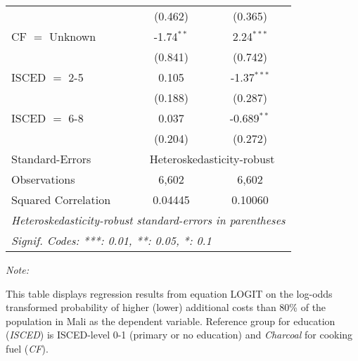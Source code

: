 \begin{table}[htbp!]
\begin{adjustbox}{width = 1\textwidth, max height = 0.95\textheight, center}
\begin{threeparttable}[b]
\begin{tabular}{lcc}
                                 & (0.462)        & (0.365)\\   
            CF $=$ Unknown       & -1.74$^{**}$   & 2.24$^{***}$\\   
                                 & (0.841)        & (0.742)\\   
            ISCED $=$ 2-5        & 0.105          & -1.37$^{***}$\\   
                                 & (0.188)        & (0.287)\\   
            ISCED $=$ 6-8        & 0.037          & -0.689$^{**}$\\   
                                 & (0.204)        & (0.272)\\   
            \midrule 
            Standard-Errors & \multicolumn{2}{c}{Heteroskedasticity-robust} \\ 
            Observations         & 6,602          & 6,602\\  
            Squared Correlation  & 0.04445        & 0.10060\\  
            \midrule \midrule
            \multicolumn{3}{l}{\emph{Heteroskedasticity-robust standard-errors in parentheses}}\\
            \multicolumn{3}{l}{\emph{Signif. Codes: ***: 0.01, **: 0.05, *: 0.1}}\\
         \end{tabular}
         
         \begin{tablenotes}\item \medskip \textit{Note:}
            \item This table displays regression results from equation LOGIT on the log-odds transformed probability of higher (lower) additional costs than 80\% of the population in Mali as the dependent variable. Reference group for education (\textit{ISCED}) is ISCED-level 0-1 (primary or no education) and \textit{Charcoal} for cooking fuel (\textit{CF}).
         \end{tablenotes}
      \end{threeparttable}
   \end{adjustbox}
\end{table}


